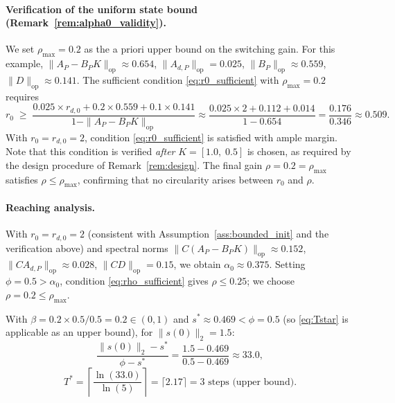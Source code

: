 \documentclass[10pt]{amsart}
\numberwithin{equation}{section}
\begin{document}
\paragraph{Verification of the uniform state bound (Remark~\ref{rem:alpha0_validity}).}
We set $\rho_{\max} = 0.2$ as the a priori upper bound on the switching gain.
For this example, $\|A_P - B_PK\|_{\mathrm{op}} \approx 0.654$,
$\|A_{d,P}\|_{\mathrm{op}} = 0.025$, $\|B_P\|_{\mathrm{op}} \approx 0.559$,
$\|D\|_{\mathrm{op}} \approx 0.141$. The sufficient condition \eqref{eq:r0_sufficient}
with $\rho_{\max} = 0.2$ requires
\[
  r_0 \;\geq\; \frac{0.025 \times r_{d,0} + 0.2 \times 0.559 + 0.1 \times 0.141}{1 - \|A_P - B_PK\|_{\mathrm{op}}}
  \approx \frac{0.025 \times 2 + 0.112 + 0.014}{1 - 0.654}
  = \frac{0.176}{0.346} \approx 0.509.
\]
With $r_0 = r_{d,0} = 2$, condition \eqref{eq:r0_sufficient} is satisfied with ample
margin. Note that this condition is verified \emph{after} $K = [1.0,\;0.5]$ is chosen,
as required by the design procedure of Remark~\ref{rem:design}. The final gain
$\rho = 0.2 = \rho_{\max}$ satisfies $\rho \leq \rho_{\max}$, confirming that no
circularity arises between $r_0$ and $\rho$.

\paragraph{Reaching analysis.}
With $r_0=r_{d,0}=2$ (consistent with Assumption~\ref{ass:bounded_init} and the
verification above) and spectral norms $\|C(A_P-B_PK)\|_{\mathrm{op}} \approx 0.152$,
$\|CA_{d,P}\|_{\mathrm{op}} \approx 0.028$, $\|CD\|_{\mathrm{op}} = 0.15$, we obtain
$\alpha_0 \approx 0.375$. Setting $\phi=0.5>\alpha_0$, condition
\eqref{eq:rho_sufficient} gives $\rho \leq 0.25$; we choose $\rho=0.2 \leq \rho_{\max}$.

With $\beta = 0.2\times 0.5/0.5 = 0.2 \in (0,1)$ and
$s^* \approx 0.469 < \phi = 0.5$ (so \eqref{eq:Tstar} is applicable as an upper
bound), for $\|s(0)\|_2 = 1.5$:
\[
\frac{\|s(0)\|_2 - s^*}{\phi - s^*}
= \frac{1.5 - 0.469}{0.5 - 0.469} \approx 33.0,
\]
\[
T^* = \left\lceil\frac{\ln(33.0)}{\ln(5)}\right\rceil
    = \lceil 2.17 \rceil = 3\text{ steps (upper bound)}.
\]
\end{document}
